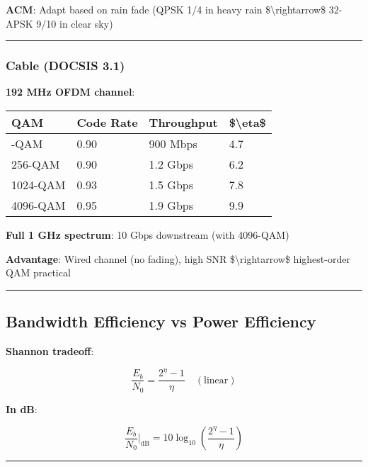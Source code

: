 \textbf{ACM}: Adapt based on rain fade (QPSK 1/4 in heavy rain
\$\textbackslash rightarrow\$ 32-APSK 9/10 in clear sky)

\begin{center}\rule{0.5\linewidth}{0.5pt}\end{center}

\subsubsection{Cable (DOCSIS 3.1)}\label{cable-docsis-3.1}

\textbf{192 MHz OFDM channel}:

{\def\LTcaptype{} %
\begin{longtable}[]{@{}llll@{}}
\toprule\noalign{}
QAM & Code Rate & Throughput & \$\textbackslash eta\$ \\
\midrule\noalign{}
\endhead
\bottomrule\noalign{}
\endlastfoot
64-QAM & 0.90 & 900 Mbps & 4.7 \\
256-QAM & 0.90 & 1.2 Gbps & 6.2 \\
1024-QAM & 0.93 & 1.5 Gbps & 7.8 \\
4096-QAM & 0.95 & 1.9 Gbps & 9.9 \\
\end{longtable}
}

\textbf{Full 1 GHz spectrum}: 10 Gbps downstream (with 4096-QAM)

\textbf{Advantage}: Wired channel (no fading), high SNR
\$\textbackslash rightarrow\$ highest-order QAM practical

\begin{center}\rule{0.5\linewidth}{0.5pt}\end{center}

\subsection{Bandwidth Efficiency vs Power
Efficiency}\label{bandwidth-efficiency-vs-power-efficiency}

\textbf{Shannon tradeoff}:

\[
\frac{E_b}{N_0} = \frac{2^\eta - 1}{\eta} \quad (\text{linear})
\]

\textbf{In dB}:

\[
\frac{E_b}{N_0} \bigg|_{\text{dB}} = 10\log_{10}\left(\frac{2^\eta - 1}{\eta}\right)
\]

\begin{center}\rule{0.5\linewidth}{0.5pt}\end{center}

